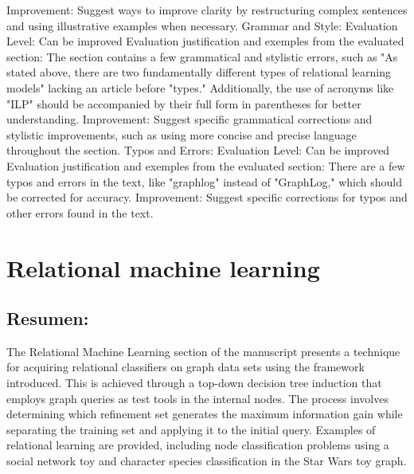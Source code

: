 \documentclass{article}%
\begin{document}
Improvement: Suggest ways to improve clarity by restructuring complex sentences and using illustrative examples when necessary.\newline%
\newline%
Grammar and Style:\newline%
Evaluation Level: Can be improved\newline%
Evaluation justification and exemples from the evaluated section: The section contains a few grammatical and stylistic errors, such as "As stated above, there are two fundamentally different types of relational learning models" lacking an article before "types." Additionally, the use of acronyms like "ILP" should be accompanied by their full form in parentheses for better understanding.\newline%
\newline%
Improvement: Suggest specific grammatical corrections and stylistic improvements, such as using more concise and precise language throughout the section.\newline%
\newline%
Typos and Errors:\newline%
Evaluation Level: Can be improved\newline%
Evaluation justification and exemples from the evaluated section: There are a few typos and errors in the text, like "graphlog" instead of "GraphLog," which should be corrected for accuracy.\newline%
\newline%
Improvement: Suggest specific corrections for typos and other errors found in the text.

%
\clearpage%
\section{Relational machine learning}%
\label{sec:Relationalmachinelearning}%
\subsection{Resumen:}%
\label{subsec:Resumen}%
\newline%
The Relational Machine Learning section of the manuscript presents a technique for acquiring relational classifiers on graph data sets using the framework introduced. This is achieved through a top{-}down decision tree induction that employs graph queries as test tools in the internal nodes. The process involves determining which refinement set generates the maximum information gain while separating the training set and applying it to the initial query. Examples of relational learning are provided, including node classification problems using a social network toy and character species classification in the Star Wars toy graph.
\end{document}
